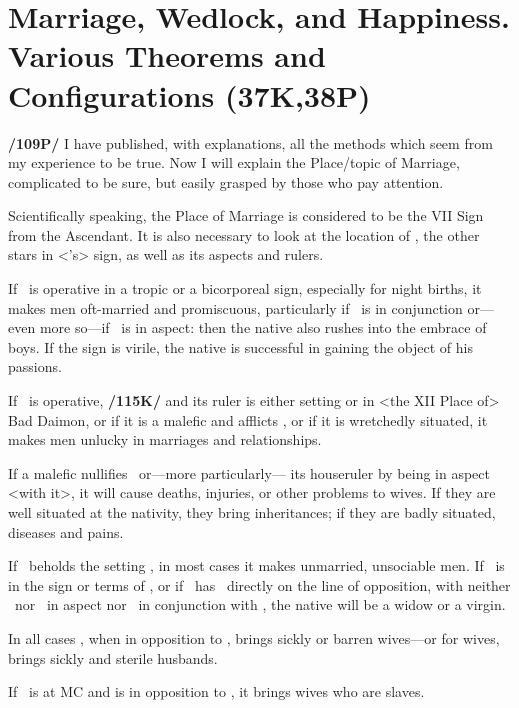 \section{Marriage, Wedlock, and Happiness. Various Theorems and Configurations (37K,38P)}
\textbf{/109P/} I have published, with explanations, all the methods which seem from my experience to be true. Now
I will explain the Place/topic of Marriage, complicated to be sure, but easily grasped by those who pay attention.

Scientifically speaking, the Place of Marriage is considered to be the VII Sign from the Ascendant. It is also necessary to look at the location of \Venus, the other stars in <\Venus’s> sign, as well as its aspects and rulers. 

If \Venus\, is operative in a tropic or a bicorporeal sign, especially for night births, it makes men oft-married and promiscuous, particularly if \Mercury\, is in conjunction or—even more so—if \Mars\, is in aspect: then the native also rushes into the embrace of boys. If the sign is virile, the native is successful in gaining the object of his passions. 

If \Venus\, is operative, \textbf{/115K/} and its ruler is either setting or in <the XII Place of> Bad Daimon, or if it is a malefic and afflicts \Venus, or if it is wretchedly situated, it makes men unlucky in marriages and relationships. 

If a malefic nullifies \Venus\, or—more particularly—
its houseruler by being in aspect <with it>, it will cause deaths, injuries, or other problems to wives. If they are well situated at the nativity, they bring inheritances; if they are badly situated, diseases and pains.

If \Saturn\, beholds the setting \Venus, in most cases it makes unmarried, unsociable men. If \Venus\, is in the sign or terms of \Saturn, or if \Venus\, has \Saturn\, directly on the line of opposition, with neither \Mars\, nor \Jupiter\, in aspect nor \Mercury\, in conjunction with \Venus, the native will be a widow or a virgin. 

In all cases \Saturn, when in opposition to \Venus, brings sickly or barren wives—or for wives, brings sickly and
sterile husbands. 

If \Saturn\, is at MC and is in opposition to \Venus, it brings wives who are slaves. 

